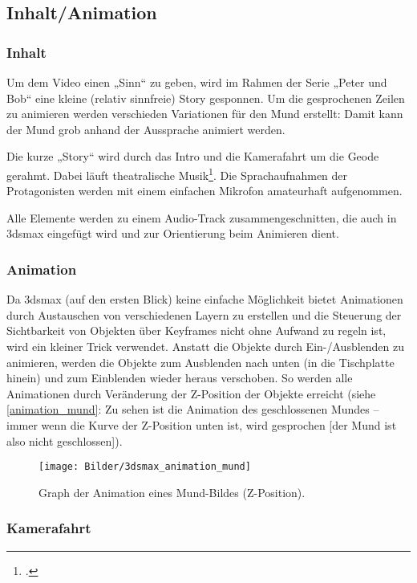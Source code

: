 \documentclass{scrreprt}
\begin{document}
\subsection{Inhalt/Animation}

\subsubsection{Inhalt}
Um dem Video einen „Sinn“ zu geben, wird im Rahmen der Serie „Peter und Bob“ eine kleine (relativ sinnfreie) Story gesponnen. Um die gesprochenen Zeilen zu animieren werden verschieden Variationen für den Mund erstellt: Damit kann der Mund grob anhand der Aussprache animiert werden.

Die kurze „Story“ wird durch das Intro und die Kamerafahrt um die Geode gerahmt. Dabei läuft theatralische Musik\footcite{Wiebusch2017}. Die Sprachaufnahmen der Protagonisten werden mit einem einfachen Mikrofon amateurhaft aufgenommen. 

Alle Elemente werden zu einem Audio-Track zusammengeschnitten, die auch in 3dsmax eingefügt wird und zur Orientierung beim Animieren dient.

\subsubsection{Animation}

Da 3dsmax (auf den ersten Blick) keine einfache Möglichkeit bietet Animationen durch Austauschen von verschiedenen Layern zu erstellen und die Steuerung der Sichtbarkeit von Objekten über Keyframes nicht ohne Aufwand zu regeln ist, wird ein kleiner Trick verwendet. Anstatt die Objekte durch Ein-/Ausblenden zu animieren, werden die Objekte zum Ausblenden nach unten (in die Tischplatte hinein) und zum Einblenden wieder heraus verschoben. So werden alle Animationen durch Veränderung der Z-Position der Objekte erreicht (siehe \autoref{animation_mund}: Zu sehen ist die Animation des geschlossenen Mundes -- immer wenn die Kurve der Z-Position unten ist, wird gesprochen [der Mund ist also nicht geschlossen]).

\begin{figure}[!ht]
\centering
\texttt{[image: Bilder/3dsmax\_animation\_mund]}
\caption{Graph der Animation eines Mund-Bildes (Z-Position).}
\label{animation_mund}
\end{figure}

\subsubsection{Kamerafahrt}
\end{document}
